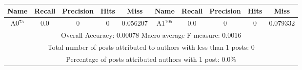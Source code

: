 \begin{tabular}{|c|c|c|c|c||c|c|c|c|c|}
\hline 
Name & Recall & Precision & Hits & Miss &Name & Recall & Precision & Hits & Miss \\ 
\hline 
A0$^{75}$ & 0.0 & 0 & 0 & 0.056207 & A1$^{105}$ & 0.0 & 0 & 0 & 0.079332 \\ 
\hline 
\multicolumn{10}{|c|}{Overall Accuracy: 0.00078 Macro-average F-measure: 0.0016}\\ 
\multicolumn{10}{|c|}{Total number of posts attributed to authors with less than 1 posts: 0}\\ 
\multicolumn{10}{|c|}{Percentage of posts attributed authors with 1 post: 0.0\%}\\ 
\hline 
\end{tabular}